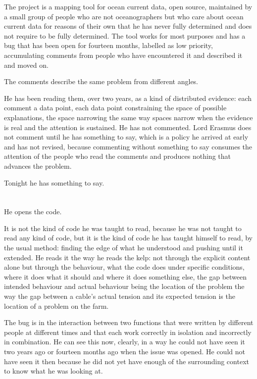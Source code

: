The project is a mapping tool for ocean current
data, open source, maintained by a small group
of people who are not oceanographers but who
care about ocean current data for reasons of
their own that he has never fully determined and
does not require to be fully determined. The tool
works for most purposes and has a bug that has
been open for fourteen months, labelled as low
priority, accumulating comments from people who
have encountered it and described it and moved on.

The comments describe the same problem from
different angles.

He has been reading them, over two years, as
a kind of distributed evidence: each comment
a data point, each data point constraining the
space of possible explanations, the space
narrowing the same way spaces narrow when the
evidence is real and the attention is sustained.
He has not commented. Lord Erasmus does not
comment until he has something to say, which
is a policy he arrived at early and has not
revised, because commenting without something
to say consumes the attention of the people
who read the comments and produces nothing
that advances the problem.

Tonight he has something to say.

\section{}

He opens the code.

It is not the kind of code he was taught to read,
because he was not taught to read any kind of code,
but it is the kind of code he has taught himself
to read, by the usual method: finding the edge of
what he understood and pushing until it extended.
He reads it the way he reads the kelp: not through
the explicit content alone but through the behaviour,
what the code does under specific conditions, where
it does what it should and where it does something
else, the gap between intended behaviour and actual
behaviour being the location of the problem the way
the gap between a cable's actual tension and its
expected tension is the location of a problem on
the farm.

The bug is in the interaction between two functions
that were written by different people at different
times and that each work correctly in isolation and
incorrectly in combination. He can see this now,
clearly, in a way he could not have seen it two
years ago or fourteen months ago when the issue
was opened. He could not have seen it then because
he did not yet have enough of the surrounding
context to know what he was looking at.

